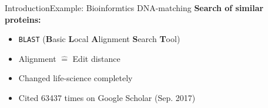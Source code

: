 
\begin{frame}{Introduction}{Example: Bioinformtics DNA-matching}
  \textbf{Search of similar proteins:}
  \begin{itemize}
    \item<2->
      \texttt{BLAST} (\textbf{B}asic \textbf{L}ocal \textbf{A}lignment
        \textbf{S}earch \textbf{T}ool)
    \item<3->
      Alignment $\hat{=}$ Edit distance
    \item<4->
      Changed life-science completely
    \item<5->
      Cited 63437 times on Google Scholar (Sep. 2017)
  \end{itemize}
\end{frame}
